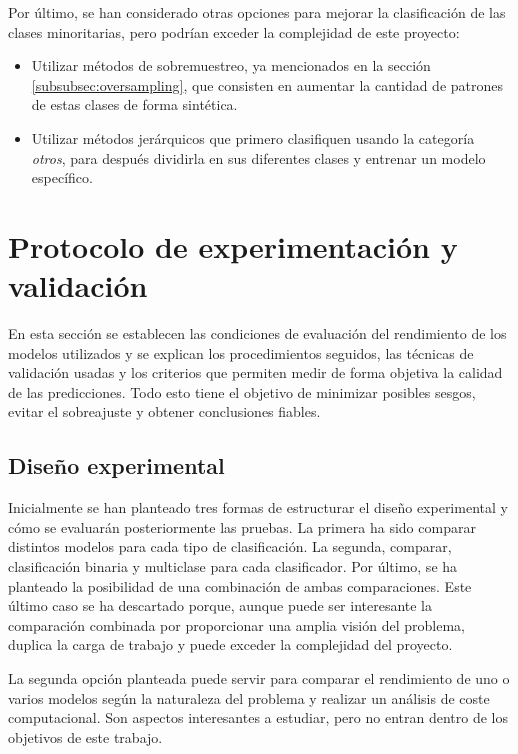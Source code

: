 Por último, se han considerado otras opciones para mejorar la clasificación de las clases minoritarias, pero podrían exceder la complejidad de este proyecto:

\begin{itemize}
	\item Utilizar métodos de sobremuestreo, ya mencionados en la sección \ref{subsubsec:oversampling}, que consisten en aumentar la cantidad de patrones de estas clases de forma sintética.
	\item Utilizar métodos jerárquicos que primero clasifiquen usando la categoría \textit{otros}, para después dividirla en sus diferentes clases y entrenar un modelo específico.
\end{itemize}

\newpage
\section{Protocolo de experimentación y validación}
\label{sec:protocolo_exper}

En esta sección se establecen las condiciones de evaluación del rendimiento de los modelos utilizados y se explican los procedimientos seguidos, las técnicas de validación usadas y los criterios que permiten medir de forma objetiva la calidad de las predicciones. Todo esto tiene el objetivo de minimizar posibles sesgos, evitar el sobreajuste y obtener conclusiones fiables.

\subsection{Diseño experimental}
\label{subsec:diseño}

Inicialmente se han planteado tres formas de estructurar el diseño experimental y cómo se evaluarán posteriormente las pruebas. La primera ha sido comparar distintos modelos para cada tipo de clasificación. La segunda, comparar, clasificación binaria y multiclase para cada clasificador. Por último, se ha planteado la posibilidad de una combinación de ambas comparaciones. Este último caso se ha descartado porque, aunque puede ser interesante la comparación combinada por proporcionar una amplia visión del problema, duplica la carga de trabajo y puede exceder la complejidad del proyecto.

\vspace{1em}

La segunda opción planteada puede servir para comparar el rendimiento de uno o varios modelos según la naturaleza del problema y realizar un análisis de coste computacional. Son aspectos interesantes a estudiar, pero no entran dentro de los objetivos de este trabajo.

